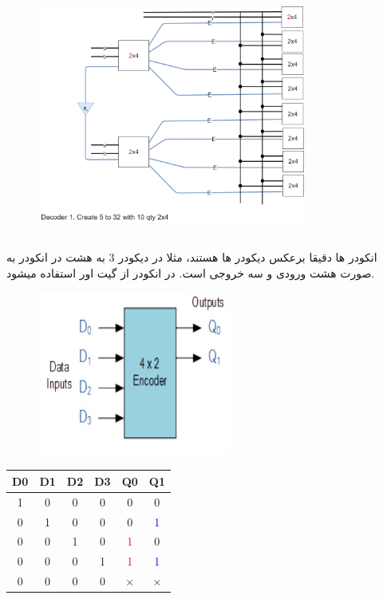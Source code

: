 \documentclass[20pt, a4paper]{article}
\begin{document}
\begin{figure}[htbp]\centering
	\centerline{\includegraphics[width=250pt]{Decoders/decoders4.png}}
\end{figure}

\newpage

\subsection{}

انکودر ها دقیقا برعکس دیکودر ها هستند، مثلا در دیکودر 3 به هشت
در انکودر به صورت هشت ورودی و سه خروجی است. در انکودر از گیت اور استفاده میشود.


\begin{figure}[htbp]\centering
	\centerline{\includegraphics[width=180pt]{img/lastest/encoder.jpg}}
\end{figure}

\begin{LTR}
	\begin{tabular}{ c c c c | c | c }
		D0 & D1 & D2 & D3 & Q0 & Q1\\
		\hline
		1 & 0 & 0 & 0 & 0 & 0\\
		0 & 1 & 0 & 0 & 0 & \textcolor{blue}{1}\\
		0 & 0 & 1 & 0 & \textcolor{red}{1} & 0\\
		0 & 0 & 0 & 1 & \textcolor{red}{1} & \textcolor{blue}{1}\\
		0 & 0 & 0 & 0 & × & ×
	\end{tabular}
\end{LTR}
\hfill \break
\end{document}
